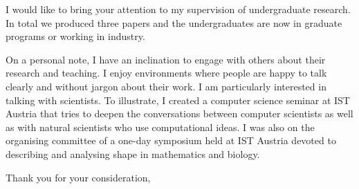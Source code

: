 \documentclass{letter}
\begin{document}
\begin{letter}{}
I would like to bring your attention to my supervision of undergraduate research. In total we produced three papers and the undergraduates are now in graduate programs or working in industry.

On a personal note, I have an inclination to engage with others about their research and teaching. I enjoy environments where people are happy to talk clearly and without jargon about their work. I am particularly interested in talking with scientists. To illustrate, I created a computer science seminar at IST Austria that tries to deepen the conversations between computer scientists as well as with natural scientists who use computational ideas. 
I was also on the organising committee of a one-day symposium held at IST Austria devoted to describing and analysing shape in mathematics and biology. 

\closing{Thank you for your consideration,}
\end{letter}
\end{document}
